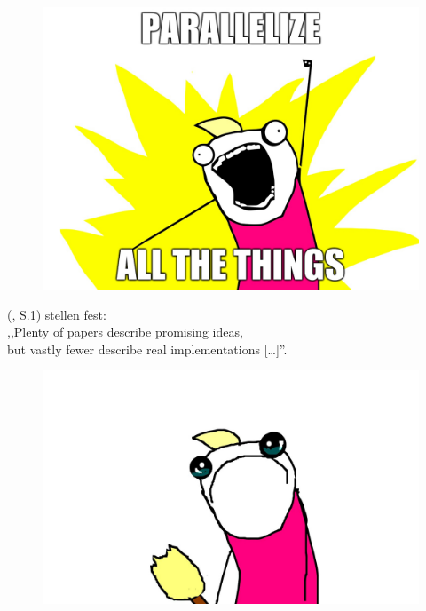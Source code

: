 \documentclass[presentation, shownotes]{beamer}
\begin{document}
\begin{frame}[plain]{}
\begin{figure}
\centering
\includegraphics[height=.7\textheight]{parallel}
\end{figure}
\end{frame}

\begin{frame}
    \centering
    \citeauthor{marlow2009runtime} (\citeyear{marlow2009runtime}, S.1) stellen fest:\\ \bigskip
    \Large{
        ,,Plenty of papers describe promising ideas,\\ but vastly fewer describe real implementations [\dots]''.
    }
\end{frame}

\begin{frame}[plain]{}
\begin{figure}
\centering
\includegraphics[height=.7\textheight]{sad}
\end{figure}
\end{frame}
\end{document}
